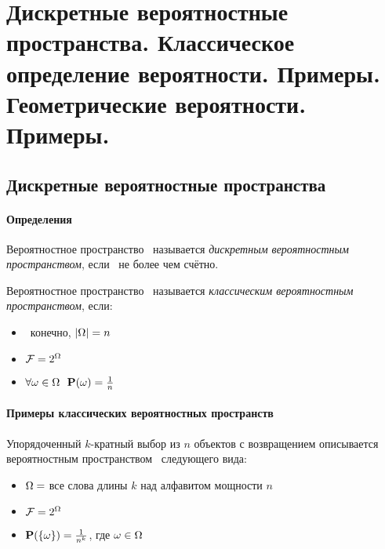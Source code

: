 \section{Дискретные вероятностные пространства. Классическое определение вероятности. Примеры. Геометрические вероятности. Примеры.}

\subsection{Дискретные вероятностные пространства}

\paragraph{Определения}

\begin{definition}
Вероятностное пространство \PSP~называется {\it дискретным вероятностным пространством}, если \oO~не более чем счётно.
\end{definition}

\begin{definition}
Вероятностное пространство \PSP~называется {\it классическим вероятностным пространством}, если:
	\begin{itemize}
	\item \oO~конечно, $|\Omega| = n $
	\item $\mathcal{F} = 2^{\Omega}$
	\item $\forall \omega \in \Omega~~\mathbf{P}(\omega) = \frac{1}{n}$
	\end{itemize}
\end{definition}


\paragraph{Примеры классических вероятностных пространств}


\begin{example}
Упорядоченный $k$-кратный выбор из $n$ объектов с возвращением описывается вероятностным пространством \PSP~следующего вида:
\begin{itemize}
		\item $\Omega = $ все слова длины $k$ над алфавитом мощности $n$
		\item $\mathcal{F} = 2^{\Omega}$
		\item $\mathbf{P}(\{\omega\}) = \frac{1}{n^k}$, где $\omega \in \Omega$
	\end{itemize}
\end{example}

